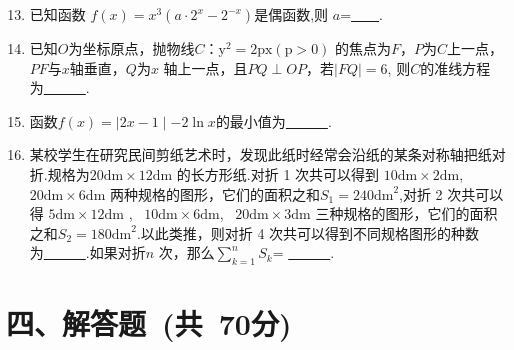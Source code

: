 \documentclass[twocolumn,landscape]{article}
\newcommand{\putzdx}{\marginpar{
		\parbox{1cm}{\vspace{-1.6cm}
			\rotatebox[origin=c]{90}{
				\usebox{\zdx}
		}}
}}
\begin{document}
		\begin{enumerate}\setcounter{enumi}{12}
			\item 已知函数 $f(x)=x^3(a\cdot2^x-2^{-x})$是偶函数,则 $a$=\underline{~~~~}.
			
			\item 已知$O$为坐标原点，抛物线$C$：$\mathrm{y^2= 2px( p> 0) }$ 的焦点为$F$，$P$为$C$上一点，$PF$与$x$轴垂直，$Q$为$x$ 轴上一点，且$PQ\perp OP$，若$\mid FQ\mid =6$, 则$C$的准线方程为\underline{~~~~~~}.
			
			\item 函数$f(x)=\mid {2x-1}\mid-2\ln{x}$的最小值为\underline{~~~~~~}.
   
			\item 某校学生在研究民间剪纸艺术时，发现此纸时经常会沿纸的某条对称轴把纸对折.规格为$20\mathrm{dm}\times 12\mathrm{dm}$ 的长方形纸.对折 1 次共可以得到 $10\mathrm{dm}\times 2\mathrm{dm}$,~ $20\mathrm{dm}\times 6\mathrm{dm}$ 两种规格的图形，它们的面积之和$S_1=240 \mathrm{dm}^2$,对折 2 次共可以得 $5\mathrm{dm}\times 12\mathrm{dm}$ ,~ $10\mathrm{dm}\times 6\mathrm{dm}$,~ $20\mathrm{dm}\times 3\mathrm{dm}$ 三种规格的图形，它们的面积之和$S_{2}=180\mathrm{dm}^{2}$.以此类推，则对折 4 次共可以得到不同规格图形的种数为\underline{~~~~~~}.如果对折$n$ 次，那么$\sum_{k=1}^{n}S_k$= \underline{~~~~~~}.
			
		\end{enumerate}
		
		\putzdx %
		
		\section*{四、解答题~(共~70分)}
\end{document}
